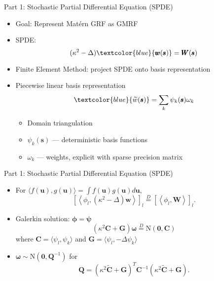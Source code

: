 \documentclass{beamer}
\begin{document}
\begin{frame}{Part 1: Stochastic Partial Differential Equation (SPDE)}{\citep{Lindgren2011}}

\begin{itemize}
\addtolength{\itemsep}{0.5\baselineskip}
\item Goal: Represent Mat\'ern GRF as GMRF
\item SPDE:
$$ (\kappa^{2} - \Delta)\textcolor{blue}{\pmb{w}(\pmb{s})} = \pmb{W}(\pmb{s})$$
\item Finite Element Method: project SPDE onto basis representation
\item Piecewise linear basis representation
$$ \textcolor{blue}{\widetilde{w}(\pmb{s})} = \sum_{k} \psi_{k}(\pmb{s})\omega_{k}$$
        \begin{itemize}
        \addtolength{\itemsep}{0.5\baselineskip}
        \item Domain triangulation
        \item $\psi_{k}(\pmb{s})$ --- deterministic basis functions
        \item $\omega_{k}$ --- weights, explicit with sparse precision matrix
        \end{itemize}
\end{itemize}

\end{frame}


\begin{frame}{Part 1: Stochastic Partial Differential Equation (SPDE)}{\citep{Lindgren2011}}
\begin{itemize}
\item For $\langle f(\pmb{u}), g(\pmb{u}) \rangle = \int f(\pmb{u}) g(\pmb{u}) d\pmb{u}$,
\begin{equation} %
\left[ \left< \phi_{l}, (\kappa^{2} - \Delta) \pmb{w} \right> \right]_{l} 
\overset{D}{=}
\left[ \left< \phi_{l}, \pmb{W} \right> \right]_{l}. \nonumber
\end{equation}
\item Galerkin solution: $\pmb{\phi} = \pmb{\psi}$
$$ \left(
\kappa^{2} \pmb{C} + \pmb{G} \right) \pmb{\omega} \overset{D}{=} \text{N}(\pmb{0},\pmb{C})$$
where $\pmb{C} = \langle \psi_{l}, \psi_{k} \rangle$ and $ \pmb{G} = \langle \psi_{l}, - \Delta \psi_{k} \rangle$
\item $\pmb{\omega} \sim \text{N}(\pmb{0}, \pmb{Q}^{-1})$ for
$$\pmb{Q} = \left( \kappa^{2} \widetilde{\pmb{C}} + \pmb{G} \right)^{T} \pmb{C}^{-1} \left( \kappa^{2} \widetilde{\pmb{C}} + \pmb{G} \right).$$
\end{itemize}
\end{frame}
\end{document}
